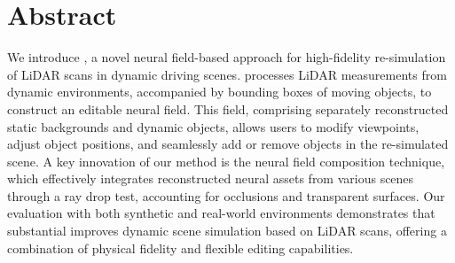 \section*{Abstract}
We introduce \dynfl, a novel neural field-based approach for high-fidelity re-simulation of LiDAR scans in dynamic driving scenes. \dynfl processes LiDAR measurements from dynamic environments, accompanied by bounding boxes of moving objects, to construct an editable neural field. This field, comprising separately reconstructed static backgrounds and dynamic objects, allows users to modify viewpoints, adjust object positions, and seamlessly add or remove objects in the re-simulated scene.
%
A key innovation of our method is the neural field composition technique, which effectively integrates reconstructed neural assets from various scenes through a ray drop test, accounting for occlusions and transparent surfaces.
Our evaluation with both synthetic and real-world environments demonstrates that \dynfl substantial improves dynamic scene simulation based on LiDAR scans, offering a combination of physical fidelity and flexible editing capabilities. \url{}